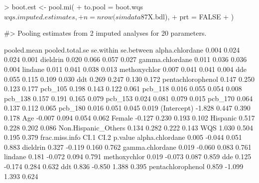 \begin{Schunk}
\begin{Sinput}
> boot.est <- pool.mi(
+   to.pool = boot.wqs$wqs.imputed.estimates, 
+   n = nrow(simdata87$X.bdl),
+   prt = FALSE
+ )
\end{Sinput}
\begin{Soutput}
#> Pooling estimates from 2 imputed analyses for 20 parameters. 
\end{Soutput}
\end{Schunk}

\begin{Schunk}
\begin{Soutput}
                    pooled.mean pooled.total.se se.within se.between
alpha.chlordane           0.004           0.024     0.024      0.001
dieldrin                  0.020           0.066     0.057      0.027
gamma.chlordane           0.011           0.036     0.036      0.004
lindane                   0.011           0.041     0.038      0.013
methoxychlor              0.007           0.041     0.041      0.004
dde                       0.055           0.115     0.109      0.030
ddt                       0.269           0.247     0.130      0.172
pentachlorophenol         0.147           0.250     0.123      0.177
pcb_105                   0.198           0.143     0.122      0.061
pcb_118                   0.016           0.055     0.054      0.008
pcb_138                   0.157           0.191     0.165      0.079
pcb_153                   0.024           0.081     0.079      0.015
pcb_170                   0.064           0.137     0.112      0.065
pcb_180                   0.016           0.051     0.045      0.019
(Intercept)              -1.828           0.447     0.390      0.178
Age                      -0.007           0.094     0.054      0.062
Female                   -0.127           0.230     0.193      0.102
Hispanic                  0.517           0.228     0.202      0.086
Non.Hispanic_Others       0.134           0.282     0.222      0.143
WQS                       1.030           0.504     0.195      0.379
                    frac.miss.info   CI.1   CI.2 p.value
alpha.chlordane              0.005 -0.044  0.051   0.883
dieldrin                     0.327 -0.119  0.160   0.762
gamma.chlordane              0.019 -0.060  0.083   0.761
lindane                      0.181 -0.072  0.094   0.791
methoxychlor                 0.019 -0.073  0.087   0.859
dde                          0.125 -0.174  0.284   0.632
ddt                          0.836 -0.850  1.388   0.395
pentachlorophenol            0.859 -1.099  1.393   0.624

\end{Soutput}
\end{Schunk}
